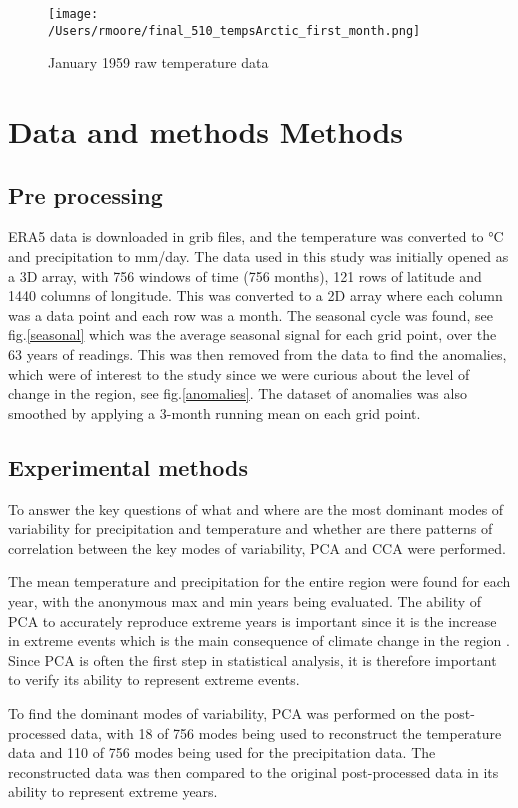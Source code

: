 \documentclass[11pt, oneside]{article}
\begin{document}
\begin{figure}[!htb]
  \centering
    \texttt{[image: /Users/rmoore/final\_510\_tempsArctic\_first\_month.png]}
  \caption{January 1959 raw temperature data}\label{raw}
  \end{figure}




\section{Data and methods Methods}
\subsection{Pre processing}
ERA5 data is downloaded in grib files, and the temperature was converted to °C and precipitation to mm/day. The data used in this study was initially opened as a 3D array, with 756 windows of time (756 months), 121 rows of latitude and 1440 columns of longitude. This was converted to a 2D array where each column was a data point and each row was a month. The seasonal cycle was found, see fig.\ref{seasonal} which was the average seasonal signal for each grid point, over the 63 years of readings. This was then removed from the data to find the anomalies, which were of interest to the study since we were curious about the level of change in the region, see fig.\ref{anomalies}. The dataset of anomalies was also smoothed by applying a 3-month running mean on each grid point.
 
\subsection{Experimental methods}
To answer the key questions of what and where are the most dominant modes of variability for precipitation and temperature and whether are there patterns of correlation between the key modes of variability, PCA and CCA were performed.
 
The mean temperature and precipitation for the entire region were found for each year, with the anonymous max and min years being evaluated. The ability of PCA to accurately reproduce extreme years is important since it is the increase in extreme events which is the main consequence of climate change in the region \cite{landrum2020extremes}. Since PCA is often the first step in statistical analysis, it is therefore important to verify its ability to represent extreme events.
 
To find the dominant modes of variability, PCA was performed on the post-processed data, with 18 of 756  modes being used to reconstruct the temperature data and 110 of 756 modes being used for the precipitation data. The reconstructed data was then compared to the original post-processed data in its ability to represent extreme years.
 
\end{document}
